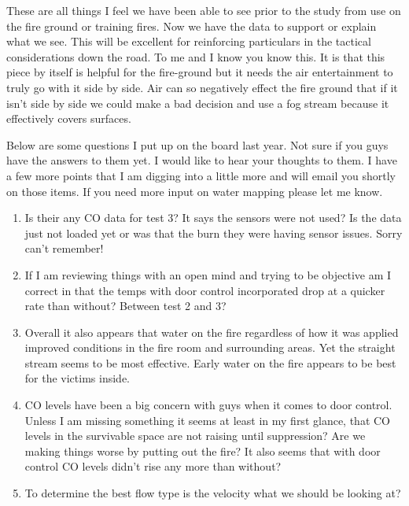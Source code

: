 \documentclass[12pt,oneside]{book}
\begin{document}
\begin{appendix}
These are all things I feel we have been able to see prior to the study from use on the fire ground or training fires. Now we have the data to support or explain what we see.  This will be excellent for reinforcing particulars in the tactical considerations down the road.  To me and I know you know this. It is that this piece by itself is helpful for the fire-ground but it needs the air entertainment to truly go with it side by side.  Air can so negatively effect the fire ground that if it isn't side by side we could make a bad decision and use a fog stream because it effectively covers surfaces. 
 
Below are some questions I put up on the board last year.  Not sure if you guys have the answers to them yet.  I would like to hear your thoughts to them.  I have a few more points that I am digging into a little more and will email you shortly on those items. If you need more input on water mapping please let me know.  
 
 
\begin{enumerate}
\item Is their any CO data for test 3? It says the sensors were not used? Is the data just not loaded yet or was that the burn they were having sensor issues. Sorry can't remember!

\item If I am reviewing things with an open mind and trying to be objective am I correct in that the temps with door control incorporated drop at a quicker rate than without? Between test 2 and 3?

\item Overall it also appears that water on the fire regardless of how it was applied improved conditions in the fire room and surrounding areas. Yet the straight stream seems to be most effective. Early water on the fire appears to be best for the victims inside.

\item CO levels have been a big concern with guys when it comes to door control. Unless I am missing something it seems at least in my first glance, that CO levels in the survivable space are not raising until suppression? Are we making things worse by putting out the fire? It also seems that with door control CO levels didn't rise any more than without?

\item To determine the best flow type is the velocity what we should be looking at?

\end{enumerate}
 

\end{appendix}
\end{document}
